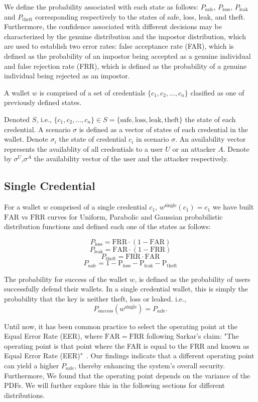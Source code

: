 \documentclass{article}
\begin{document}
We define the probability associated with each state as follows: $P_{\text{safe}}$, $P_{\text{loss}}$, $P_{\text{leak}}$ and $P_{\text{theft}}$ corresponding respectively to the states of safe, loss, leak, and theft. Furthermore, the confidence associated with different decisions may be characterized by the genuine distribution and the impostor distribution, which are used to establish two error rates: false acceptance rate (FAR), which is defined as the probability of an impostor being accepted as a genuine individual and false rejection rate (FRR), which is defined as the probability of a genuine individual being rejected as an impostor.

A wallet $w$ is comprised of a set of credentials $\{c_1, c_2, \ldots, c_n\}$ clasified as one of previously defined states.

Denoted $S$, i.e., $\{c_1, c_2, \ldots, c_n\} \in S = \{ \text{safe}, \text{loss}, \text{leak}, \text{theft} \}$ the state of each credential. A scenario $\sigma$ is defined as a vector of states of each credential in the wallet. Denote $\sigma_i$ the state of credential $c_i$ in scenario $\sigma$. An availability vector represents the availablity of all credentials to a user $U$ or an attacker $A$. Denote by $\sigma^U$,$\sigma^A$ the availability vector of the user and the attacker respectively.

\subsection{Single Credential}
For a wallet $w$ comprised of a single credential $c_1$, $w^\text{single}(c_1)=c_1$ we have built $\mathrm{FAR}$ vs $\mathrm{FRR}$ curves for Uniform, Parabolic and Gaussian probabilistic distribution functions and defined each one of the states as follows:

\[
P_{\text{loss}} = \mathrm{FRR} \cdot (1 - \mathrm{FAR})
\]
\[
P_{\text{leak}} = \mathrm{FAR} \cdot (1 - \mathrm{FRR})
\]
\[
P_{\text{theft}}=\mathrm{FRR} \cdot \mathrm{FAR}
\]
\[
P_{{\text{safe}}}=1-\mathrm{P_{\text{loss}}}-\mathrm{P_{\text{leak}}}-\mathrm{P_{\text{theft}}}
\]

The probability for success of the wallet $w$, is defined as the probability of users successfully defend their wallets. In a single credential wallet, this is simply the probability that the key is neither theft, loss or leaked. i.e.,
\[
P_{\text{success}}(w^{\text{single}}) = P_{{\text{safe}}}.
\]

Until now, it has been common practice to select the operating point at the Equal Error Rate (EER), where $\mathrm{FAR} = \mathrm{FRR}$ following Sarkar's claim: "The operating point is that point where the FAR is equal to the FRR and known as Equal Error Rate (EER)"~\cite{sarkar2020}. Our findings indicate that a different operating point can yield a higher $P_{\text{safe}}$, thereby enhancing the system’s overall security. Furthermore, We found that the operating point depends on the variance of the PDFs. We will further explore this in the following sections for different distributions.
\end{document}
